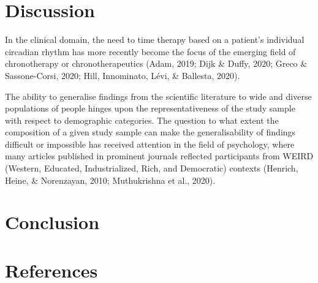 \documentclass[
  english,
  jou,floatsintext]{apa6}
\begin{document}
\hypertarget{discussion}{%
\section{Discussion}\label{discussion}}

In the clinical domain, the need to time therapy based on a patient's individual circadian rhythm has more recently become the focus of the emerging field of chronotherapy or chronotherapeutics (Adam, 2019; Dijk \& Duffy, 2020; Greco \& Sassone-Corsi, 2020; Hill, Innominato, Lévi, \& Ballesta, 2020).

The ability to generalise findings from the scientific literature to wide and diverse populations of people hinges upon the representativeness of the study sample with respect to demographic categories. The question to what extent the composition of a given study sample can make the generalisability of findings difficult or impossible has received attention in the field of psychology, where many articles published in prominent journals reflected participants from WEIRD (Western, Educated, Industrialized, Rich, and Democratic) contexts (Henrich, Heine, \& Norenzayan, 2010; Muthukrishna et al., 2020).

\hypertarget{conclusion}{%
\section{Conclusion}\label{conclusion}}

\newpage

\hypertarget{references}{%
\section{References}\label{references}}

\begingroup
\setlength{\parindent}{-0.5in}
\setlength{\leftskip}{0.5in}
\end{document}
